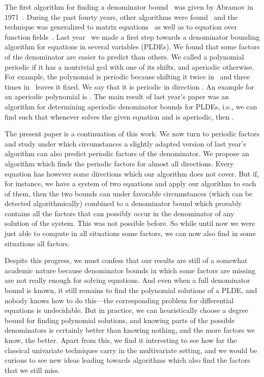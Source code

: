 \documentclass[a4paper]{sig-alternate}
\begin{document}
The first algorithm for finding a denominator bound~ was given by Abramov in
1971~\cite{abramov71,Abramov:89b,abramov91}. During the past fourty years, other
algorithms were found~\cite{paule95,hoeij98,bostan06,chen08b} and the technique
was generalized to matrix equations~\cite{abramov98a,barkatou99} as well as to
equation over function fields~\cite{Petkov:92,bronstein00,schneider04c}. Last
year~\cite{kauers10b} we made a first step towards a denominator bounding
algorithm for equations in several variables (PLDEs). We found that some factors
of the denominator are easier to predict than others. We called a polynomial
periodic if it has a nontrivial gcd with one of its shifts, and aperiodic
otherwise. For example, the polynomial  is periodic because shifting it
twice in~ and three times in~ leaves it fixed.  We say that it is periodic
in direction . An example for an aperiodic polynomial is . The
main result of last year's paper was an algorithm for determining aperiodic
denominator bounds for PLDEs, i.e., we can find  such that whenever
 solves the given equation and  is aperiodic, then .

The present paper is a continuation of this work. We now turn to periodic
factors and study under which circumstances a slightly adapted version of last
year's algorithm can also predict periodic factors of the denominator. We
propose an algorithm which finds the periodic factors for almost all
directions. Every equation has however some directions which our algorithm does
not cover. But if, for instance, we have a system of two equations and apply our
algorithm to each of them, then the two bounds can under favorable circumstances
(which can be detected algorithmically) combined to a denominator bound which
provably contains all the factors that can possibly occur in the denominator of
any solution of the system. This was not possible before. So while until now we
were just able to compute in all situations some factors, we can now also find
in some situations all factors.

Despite this progress, we must confess that our results are still of a somewhat
academic nature because denominator bounds in which some factors are missing are
not really enough for solving equations. And even when a full denominator bound
is known, it still remains to find the polynomial solutions of a PLDE, and
nobody knows how to do this---the corresponding problem for differential
equations is undecidable. But in practice, we can heuristically choose a degree
bound for finding polynomial solutions, and knowing parts of the possible
denominators is certainly better than knowing nothing, and the more factors we
know, the better. Apart from this, we find it interesting to see how far the
classical univariate techniques carry in the multivariate setting, and we would
be curious to see new ideas leading towards algorithms which also find the
factors that we still miss.
\end{document}
